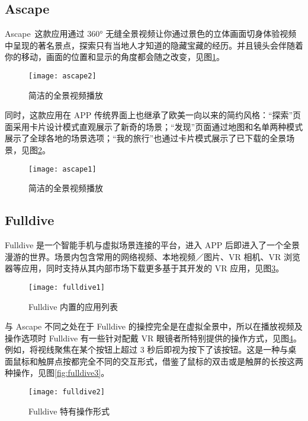 \subsection{Ascape}

Ascape 这款应用通过 360° 无缝全景视频让你通过景色的立体画面切身体验视频中呈现的著名景点，探索只有当地人才知道的隐藏宝藏的经历。并且镜头会伴随着你的移动，画面的位置和显示的角度都会随之改变，见图\ref{fig:ascape1}。

\begin{figure}[htp]
\centering
\texttt{[image: ascape2]}
\caption{简洁的全景视频播放}
\label{fig:ascape1}
\end{figure}

同时，这款应用在 APP 传统界面上也继承了欧美一向以来的简约风格：“探索”页面采用卡片设计模式直观展示了新奇的场景；“发现”页面通过地图和名单两种模式展示了全球各地的场景选项；“我的旅行”也通过卡片模式展示了已下载的全景场景，见图\ref{fig:ascape2}。

\begin{figure}[htp]
\centering
\texttt{[image: ascape1]}
\caption{简洁的全景视频播放}
\label{fig:ascape2}
\end{figure}

\subsection{Fulldive}

Fulldive 是一个智能手机与虚拟场景连接的平台，进入 APP 后即进入了一个全景漫游的世界。场景内包含常用的网络视频、本地视频／图片、VR 相机、VR 浏览器等应用，同时支持从其内部市场下载更多基于其开发的 VR 应用，见图\ref{fig:fulldive1}。

\begin{figure}[htp]
\centering
\texttt{[image: fulldive1]}
\caption{Fulldive 内置的应用列表}
\label{fig:fulldive1}
\end{figure}

与 Ascape 不同之处在于 Fulldive 的操控完全是在虚拟全景中，所以在播放视频及操作选项时 Fulldive 有一些针对配戴 VR 眼镜者所特别提供的操作方式，见图\ref{fig:fulldive2}。例如，将视线聚焦在某个按钮上超过 3 秒后即视为按下了该按钮。这是一种与桌面鼠标和触屏点按都完全不同的交互形式，借鉴了鼠标的双击或是触屏的长按这两种操作，见图\ref{fig:fulldive3}。

\begin{figure}[htp]
\centering
\texttt{[image: fulldive2]}
\caption{Fulldive 特有操作形式}
\label{fig:fulldive2}
\end{figure}

